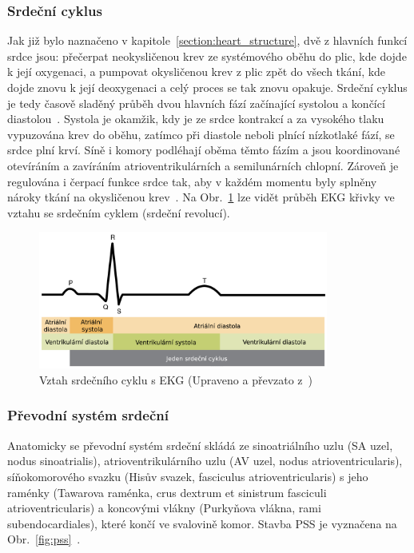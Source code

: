 \subsubsection{Srdeční cyklus}
\label{section:cardiac_cycle}
Jak již bylo naznačeno v kapitole~\ref{section:heart_structure}, dvě z hlavních
funkcí srdce jsou: přečerpat neokysličenou krev ze systémového oběhu do plic,
kde dojde k její oxygenaci, a pumpovat okysličenou krev z plic zpět do všech
tkání, kde dojde znovu k její deoxygenaci a celý proces se tak znovu opakuje.
Srdeční cyklus je tedy časově sladěný průběh dvou hlavních fází začínající
systolou a končící diastolou~\cite{Weinhaus2005}. Systola je okamžik, kdy je ze
srdce kontrakcí a za vysokého tlaku vypuzována krev do oběhu, zatímco při
diastole neboli plnící nízkotlaké fází, se srdce plní krví. Síně i komory
podléhají oběma těmto fázím a jsou koordinované otevíráním a zavíráním
atrioventrikulárních a semilunárních chlopní. Zároveň je regulována i čerpací
funkce srdce tak, aby v každém momentu byly splněny nároky tkání na okysličenou
krev~\cite{OpenStax}. Na Obr.~\ref{fig:cardiac_cycle_ecg} lze vidět průběh EKG
křivky ve vztahu se srdečním cyklem (srdeční revolucí).

\begin{figure}[h]
	\begin{center}
		\includegraphics[width=0.85\textwidth]{../assets/anatomy/cardiac_cycle_ecg}
		\caption{Vztah srdečního cyklu s EKG (Upraveno a převzato
		z~\cite{OpenStax})}
		\label{fig:cardiac_cycle_ecg}
	\end{center}
\end{figure}

\subsubsection{Převodní systém srdeční}
\label{section:pss}
Anatomicky se převodní systém srdeční skládá ze sinoatriálního uzlu (SA uzel,
nodus sinoatrialis), atrioventrikulárního uzlu (AV uzel, nodus
atrioventricularis), síňokomorového svazku (Hisův svazek, fasciculus
atrioventricularis) s jeho raménky (Tawarova raménka, crus dextrum et sinistrum
fasciculi atrioventricularis) a koncovými vlákny (Purkyňova vlákna, rami
subendocardiales), které končí ve svalovině komor. Stavba PSS je vyznačena na
Obr.~\ref{fig:pss}~\cite{Dylevsky2013}.

